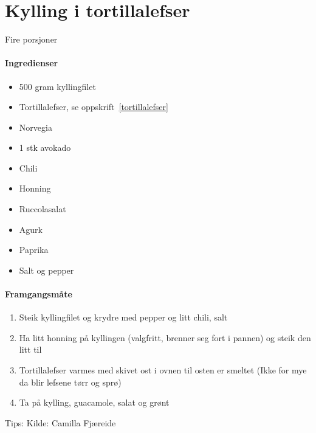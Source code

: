 \section{﻿Kylling i tortillalefser}
\label{kyllingtortilla}

Fire porsjoner

\paragraph{Ingredienser}
\begin{itemize}[noitemsep]
	\item 500 gram kyllingfilet
		\item Tortillalefser, se oppskrift~\ref{tortillalefser}
		\item Norvegia
		\item 1 stk avokado
		\item Chili
		\item Honning
		\item Ruccolasalat
		\item Agurk
		\item Paprika
		\item Salt og pepper
\end{itemize}

\paragraph{Framgangsmåte}
\begin{enumerate}[noitemsep]
	\item Steik kyllingfilet og krydre med pepper og litt chili, salt
	\item Ha litt honning på kyllingen (valgfritt, brenner seg fort i pannen) og steik den litt til
	\item Tortillalefser varmes med skivet ost i ovnen til osten er smeltet (Ikke for mye da blir lefsene tørr og sprø)
	\item Ta på kylling, guacamole, salat og grønt
\end{enumerate}

Tips:
Kilde: Camilla Fjæreide
